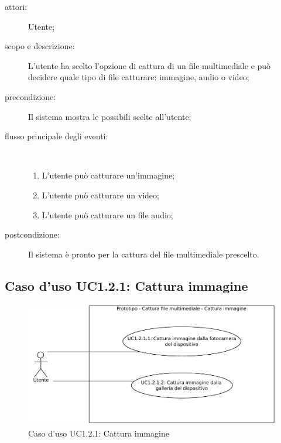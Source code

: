 \begin{description}
\item[attori:] Utente;
\item[scopo e descrizione:] L'utente ha scelto l'opzione di cattura di un file multimediale e può decidere quale tipo di file catturare: immagine, audio o video;
\item[precondizione:] Il sistema mostra le possibili scelte all'utente;
\item[flusso principale degli eventi:] \hfill \\
	\begin{enumerate}
	\item L'utente può catturare un'immagine;
	\item L'utente può catturare un video;
	\item L'utente può catturare un file audio;
	\end{enumerate}
\item[postcondizione:] Il sistema è pronto per la cattura del file multimediale prescelto.
\end{description}

\subsection{Caso d'uso UC1.2.1: Cattura immagine}
\begin{figure}[htb]
\centering
\includegraphics[scale=0.6]{gfx/useCase/UC1-2-1_Cattura_immagine.pdf}
\caption{Caso d'uso UC1.2.1: Cattura immagine}
\label{fig:UC1.2}
\end{figure}

